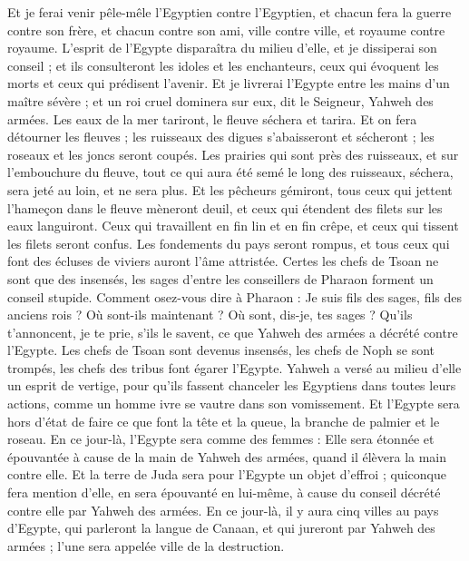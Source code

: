 \begin{multicols}{2}
Et je ferai venir pêle-mêle l'Egyptien contre l'Egyptien, et chacun fera la guerre contre son frère, et chacun contre son ami, ville contre ville, et royaume contre royaume.
L'esprit de l'Egypte disparaîtra du milieu d'elle, et je dissiperai son conseil ; et ils consulteront les idoles et les enchanteurs, ceux qui évoquent les morts et ceux qui prédisent l'avenir.
Et je livrerai l'Egypte entre les mains d'un maître sévère ; et un roi cruel dominera sur eux, dit le Seigneur, Yahweh des armées.
Les eaux de la mer tariront, le fleuve séchera et tarira.
Et on fera détourner les fleuves ; les ruisseaux des digues s'abaisseront et sécheront ; les roseaux et les joncs seront coupés.
Les prairies qui sont près des ruisseaux, et sur l'embouchure du fleuve, tout ce qui aura été semé le long des ruisseaux, séchera, sera jeté au loin, et ne sera plus.
Et les pêcheurs gémiront, tous ceux qui jettent l'hameçon dans le fleuve mèneront deuil, et ceux qui étendent des filets sur les eaux languiront.
Ceux qui travaillent en fin lin et en fin crêpe, et ceux qui tissent les filets seront confus.
Les fondements du pays seront rompus, et tous ceux qui font des écluses de viviers auront l'âme attristée.
Certes les chefs de Tsoan ne sont que des insensés, les sages d'entre les conseillers de Pharaon forment un conseil stupide. Comment osez-vous dire à Pharaon : Je suis fils des sages, fils des anciens rois ?
Où sont-ils maintenant ? Où sont, dis-je, tes sages ? Qu'ils t'annoncent, je te prie, s'ils le savent, ce que Yahweh des armées a décrété contre l'Egypte.
Les chefs de Tsoan sont devenus insensés, les chefs de Noph se sont trompés, les chefs des tribus font égarer l'Egypte.
Yahweh a versé au milieu d'elle un esprit de vertige, pour qu'ils fassent chanceler les Egyptiens dans toutes leurs actions, comme un homme ivre se vautre dans son vomissement.
Et l'Egypte sera hors d'état de faire ce que font la tête et la queue, la branche de palmier et le roseau.
En ce jour-là, l'Egypte sera comme des femmes : Elle sera étonnée et épouvantée à cause de la main de Yahweh des armées, quand il élèvera la main contre elle.
Et la terre de Juda sera pour l'Egypte un objet d'effroi ; quiconque fera mention d'elle, en sera épouvanté en lui-même, à cause du conseil décrété contre elle par Yahweh des armées.
En ce jour-là, il y aura cinq villes au pays d'Egypte, qui parleront la langue de Canaan, et qui jureront par Yahweh des armées ; l'une sera appelée ville de la destruction.

\end{multicols}
